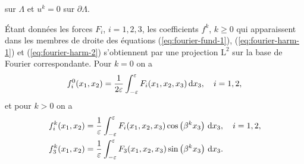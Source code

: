sur $\Lambda$ et $u^k = 0$ sur $\partial \Lambda$.

Étant données les forces $F_i$, $i = 1,2,3$, les coefficients $f^k$,
$k \geq 0$ qui apparaissent dans les membres de droite des équations
(\ref{eq:fourier-fund-1}), (\ref{eq:fourier-harm-1}) et
(\ref{eq:fourier-harm-2}) s'obtiennent par une projection $\mathrm
L^2$ sur la base de Fourier correspondante. Pour $k = 0$ on a
\begin{align}
  f_i^0(x_1, x_2) =
  \frac{1}{2\varepsilon}\int_{-\varepsilon}^{\varepsilon}F_i(x_1, x_2, x_3)\,\mathrm
  dx_3, \quad i = 1,2,\label{eq:f-1}
\end{align}
et pour $k > 0$ on a
\begin{align}
&f_i^k(x_1, x_2) =
\frac{1}{\varepsilon}\int_{-\varepsilon}^{\varepsilon}F_i(x_1, x_2,
x_3)\cos\left( \beta^k x_3 \right)\,\mathrm dx_3,\quad i = 1,2,\label{eq:f-2}\\
&f_3^k(x_1, x_2) = \frac{1}{\varepsilon}\int_{-\varepsilon}^{\varepsilon}
F_3(x_1, x_2,x_3) \sin\left( \beta^k x_3 \right)\,\mathrm dx_3.\label{eq:f-3}
\end{align}

